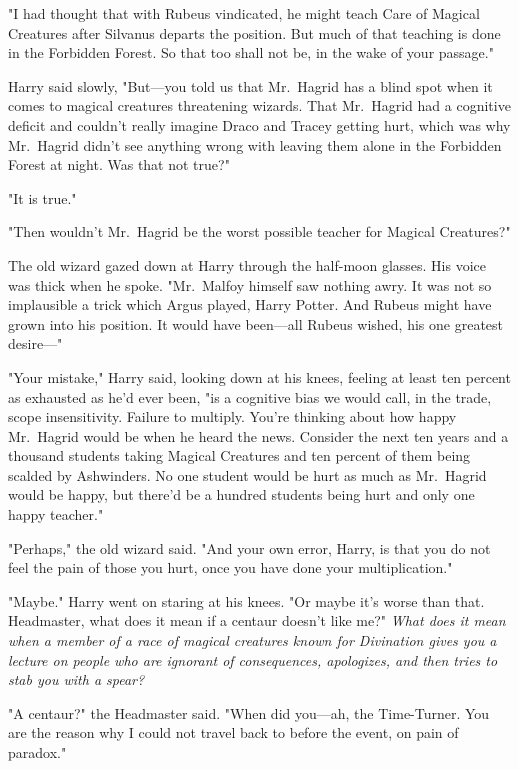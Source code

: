 "I had thought that with Rubeus vindicated, he might teach Care of Magical 
Creatures after Silvanus departs the position. But much of that teaching is 
done in the Forbidden Forest. So that too shall not be, in the wake of your 
passage."

Harry said slowly, "But---you told us that Mr.~Hagrid has a blind spot when it 
comes to magical creatures threatening wizards. That Mr.~Hagrid had a cognitive 
deficit and couldn't really imagine Draco and Tracey getting hurt, which was 
why Mr.~Hagrid didn't see anything wrong with leaving them alone in the 
Forbidden Forest at night. Was that not true?"

"It is true."

"Then wouldn't Mr.~Hagrid be the worst possible teacher for Magical Creatures?"

The old wizard gazed down at Harry through the half-moon glasses. His voice was 
thick when he spoke. "Mr.~Malfoy himself saw nothing awry. It was not so 
implausible a trick which Argus played, Harry Potter. And Rubeus might have 
grown into his position. It would have been---all Rubeus wished, his one 
greatest desire---"

"Your mistake," Harry said, looking down at his knees, feeling at least ten 
percent as exhausted as he'd ever been, "is a cognitive bias we would call, in 
the trade, scope insensitivity. Failure to multiply. You're thinking about how 
happy Mr.~Hagrid would be when he heard the news. Consider the next ten years 
and a thousand students taking Magical Creatures and ten percent of them being 
scalded by Ashwinders. No one student would be hurt as much as Mr.~Hagrid would 
be happy, but there'd be a hundred students being hurt and only one happy 
teacher."

"Perhaps," the old wizard said. "And your own error, Harry, is that you do not 
feel the pain of those you hurt, once you have done your multiplication."

"Maybe." Harry went on staring at his knees. "Or maybe it's worse than that. 
Headmaster, what does it mean if a centaur doesn't like me?" \emph{What does it 
mean when a member of a race of magical creatures known for Divination gives 
you a lecture on people who are ignorant of consequences, apologizes, and then 
tries to stab you with a spear?}

"A centaur?" the Headmaster said. "When did you---ah, the Time-Turner. You are 
the reason why I could not travel back to before the event, on pain of paradox."

